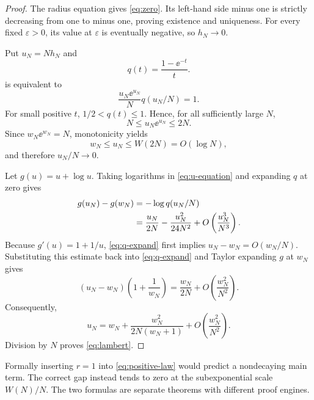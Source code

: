 \begin{proof}
The radius equation gives \cref{eq:zero}.  Its left-hand side minus one is
strictly decreasing from one to minus one, proving existence and uniqueness.
For every fixed $\varepsilon>0$, its value at $\varepsilon$ is eventually
negative, so $h_N\to0$.

Put $u_N=Nh_N$ and
\[
 q(t)=\frac{1-\ee^{-t}}{t}.
\]
 is equivalent to
\begin{equation}
 \frac{u_N\ee^{u_N}}{N}q(u_N/N)=1.
 \label{eq:u-equation}
\end{equation}
For small positive $t$, $1/2<q(t)\le1$.  Hence, for all sufficiently large
$N$,
\[
 N\le u_N\ee^{u_N}\le2N.
\]
Since $w_N\ee^{w_N}=N$, monotonicity yields
\[
 w_N\le u_N\le W(2N)=O(\log N),
\]
and therefore $u_N/N\to0$.

Let $g(u)=u+\log u$.  Taking logarithms in
\cref{eq:u-equation} and expanding $q$ at zero gives
\begin{align}
 g(u_N)-g(w_N)
 &=-\log q(u_N/N)\notag\\
 &=\frac{u_N}{2N}-\frac{u_N^2}{24N^2}
 +O\left(\frac{u_N^3}{N^3}\right).
 \label{eq:q-expand}
\end{align}
Because $g'(u)=1+1/u$, \cref{eq:q-expand} first implies
$u_N-w_N=O(w_N/N)$.  Substituting this estimate back into
\cref{eq:q-expand} and Taylor expanding $g$ at $w_N$ gives
\[
 (u_N-w_N)\left(1+\frac1{w_N}\right)
 =\frac{w_N}{2N}+O\left(\frac{w_N^2}{N^2}\right).
\]
Consequently,
\[
 u_N=w_N+\frac{w_N^2}{2N(w_N+1)}
 +O\left(\frac{w_N^2}{N^2}\right).
\]
Division by $N$ proves \cref{eq:lambert}.
\end{proof}

\begin{remark}
Formally inserting $r=1$ into \cref{eq:positive-law} would predict a
nondecaying main term.  The correct gap instead tends to zero at the
subexponential scale $W(N)/N$.  The two formulas are separate theorems with
different proof engines.
\end{remark}
